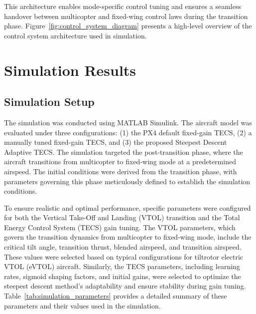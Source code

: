 \documentclass[journal,article,submit,pdftex,moreauthors]{Definitions/mdpi}
\begin{document}
This architecture enables mode-specific control tuning and ensures a seamless handover between multicopter and fixed-wing control laws during the transition phase. Figure~\ref{fig:control_system_diagram} presents a high-level overview of the control system architecture used in simulation.



\section{Simulation Results}
\subsection{Simulation Setup}
The simulation was conducted using MATLAB Simulink. The aircraft model was evaluated under three configurations: (1) the PX4 default fixed-gain TECS, (2) a manually tuned fixed-gain TECS, and (3) the proposed Steepest Descent Adaptive TECS. The simulation targeted the post-transition phase, where the aircraft transitions from multicopter to fixed-wing mode at a predetermined airspeed. The initial conditions were derived from the transition phase, with parameters governing this phase meticulously defined to establish the simulation conditions.

To ensure realistic and optimal performance, specific parameters were configured for both the Vertical Take-Off and Landing (VTOL) transition and the Total Energy Control System (TECS) gain tuning. The VTOL parameters, which govern the transition dynamics from multicopter to fixed-wing mode, include the critical tilt angle, transition thrust, blended airspeed, and transition airspeed. These values were selected based on typical configurations for tiltrotor electric VTOL (eVTOL) aircraft. Similarly, the TECS parameters, including learning rates, sigmoid shaping factors, and initial gains, were selected to optimize the steepest descent method's adaptability and ensure stability during gain tuning. Table~\ref{tab:simulation_parameters} provides a detailed summary of these parameters and their values used in the simulation.
\end{document}
